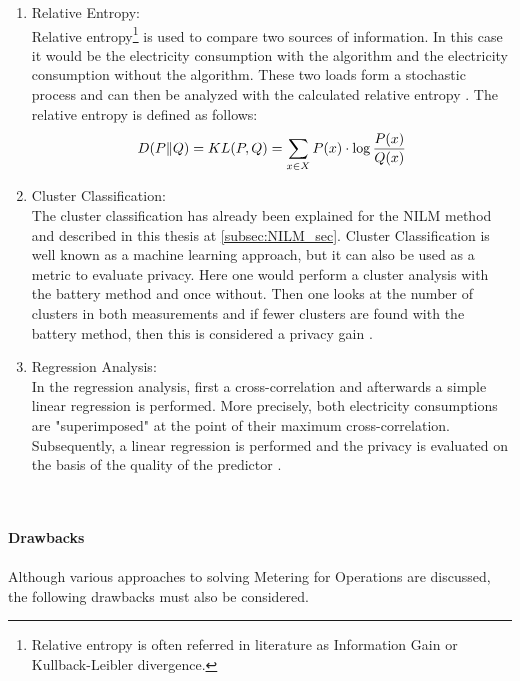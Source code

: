 \begin{enumerate}
\label{subsec:information_gain}
\item Relative Entropy:\\
Relative entropy\footnote[3]{Relative entropy is often referred in literature as Information Gain or Kullback-Leibler divergence.} is used to compare two sources of information. In this case it would be the electricity consumption with the algorithm and the electricity consumption without the algorithm. These two loads form a stochastic process and can then be analyzed with the calculated relative entropy \cite{kalogridis2011affordable}. The relative entropy is defined as follows:\\
\begin{equation}
D(P\|Q) = KL(P, Q)= \sum_{x \in X} P(x) \cdot \log {P(x) \over Q(x)}
\end{equation}
\clearpage
\item Cluster Classification:\\
The cluster classification has already been explained for the \gls{NILM} method and described in this thesis at \ref{subsec:NILM_sec}. Cluster Classification is well known as a machine learning approach, but it can also be used as a metric to evaluate privacy. Here one would perform a cluster analysis with the battery method and once without. Then one looks at the number of clusters in both measurements and if fewer clusters are found with the battery method, then this is considered a privacy gain \cite{kalogridis2010privacy}.
\item Regression Analysis:\\
In the regression analysis, first a cross-correlation and afterwards a simple linear regression is performed. More precisely, both electricity consumptions are "superimposed" at the point of their maximum cross-correlation. Subsequently, a linear regression is performed and the privacy is evaluated on the basis of the quality of the predictor \cite{mclaughlin2011protecting}.
\end{enumerate}
\\
\\
\textbf{Drawbacks}
\\
\\
Although various approaches to solving Metering for Operations are discussed, the following drawbacks must also be considered.
